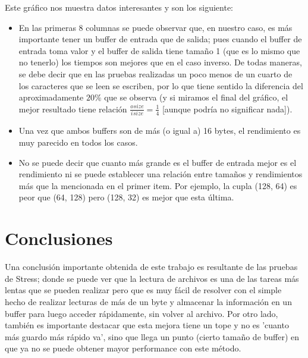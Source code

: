 \documentclass[a4paper, 10pt]{article}
\newcommand\tab[1][0.5cm]{\hspace*{#1}}
\begin{document}
    			\tab Este gráfico nos muestra datos interesantes y son los siguiente:
    			\begin{itemize}
    				\item En las primeras 8 columnas se puede observar que, en nuestro caso, es más importante tener un buffer de entrada
    				que de salida; pues cuando el buffer de entrada toma valor y el buffer de salida tiene tamaño 1 (que es lo mismo que
    				no tenerlo) los tiempos son mejores que en el caso inverso. De todas maneras, se debe decir que en las pruebas 
    				realizadas un poco menos de un cuarto de los caracteres que se leen se escriben, por lo que tiene sentido la
    				diferencia del aproximadamente $20\%$ que se observa (y si miramos el final del gráfico, el mejor resultado tiene
    				relación $\frac{o_{}size}{i_{}size} = \frac{1}{4}$ [aunque podría no significar nada]).
    				\item Una vez que ambos buffers son de más (o igual a) 16 bytes, el rendimiento es muy parecido en todos los casos.
    				\item No se puede decir que cuanto más grande es el buffer de entrada mejor es el rendimiento ni se puede establecer
    				una relación entre tamaños y rendimientos más que la mencionada en el primer item. Por ejemplo, la cupla (128, 64) es
    				peor que (64, 128) pero (128, 32) es mejor que esta última.
    			\end{itemize}

	\section{Conclusiones}
		Una conclusión importante obtenida de este trabajo es resultante de las pruebas de Stress; donde se puede ver que la lectura
		de archivos es una de las tareas más lentas que se pueden realizar pero que es muy fácil de resolver con el simple hecho de 
		realizar lecturas de más de un byte y almacenar la información en un buffer para luego acceder rápidamente, sin volver al 
		archivo. Por otro lado, también es importante destacar que esta mejora tiene un tope y no es 'cuanto más guardo más rápido
		va', sino que llega un punto (cierto tamaño de buffer) en que ya no se puede obtener mayor performance con este método.
\end{document}
